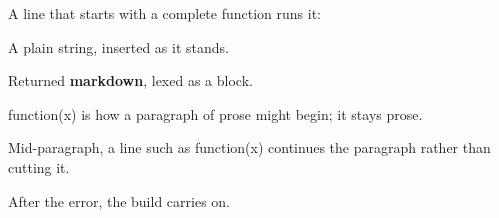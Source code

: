 A line that starts with a complete function runs it:

A plain string, inserted as it stands.

Returned \textbf{markdown}, lexed as a block.

function(x) is how a paragraph of prose might begin; it stays prose.

Mid-paragraph, a line such as
function(x) continues the paragraph rather than cutting it.





After the error, the build carries on.

